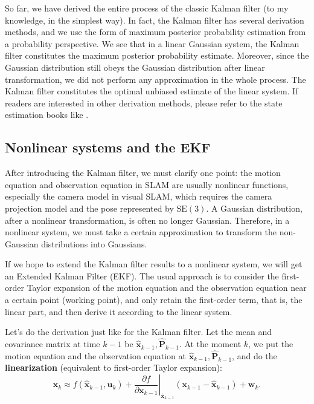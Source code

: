 So far, we have derived the entire process of the classic Kalman filter (to my knowledge, in the simplest way). In fact, the Kalman filter has several derivation methods, and we use the form of maximum posterior probability estimation from a probability perspective. We see that in a linear Gaussian system, the Kalman filter constitutes the maximum posterior probability estimate. Moreover, since the Gaussian distribution still obeys the Gaussian distribution after linear transformation, we did not perform any approximation in the whole process. The Kalman filter constitutes the optimal unbiased estimate of the linear system. If readers are interested in other derivation methods, please refer to the state estimation books like \cite{Barfoot2016}. 

\subsection{Nonlinear systems and the EKF}
After introducing the Kalman filter, we must clarify one point: the motion equation and observation equation in SLAM are usually nonlinear functions, especially the camera model in visual SLAM, which requires the camera projection model and the pose represented by $\mathrm{SE}(3)$.  A Gaussian distribution, after a nonlinear transformation, is often no longer Gaussian. Therefore, in a nonlinear system, we must take a certain approximation to transform the non-Gaussian distributions into Gaussians. 

If we hope to extend the Kalman filter results to a nonlinear system, we will get an Extended Kalman Filter (EKF). The usual approach is to consider the first-order Taylor expansion of the motion equation and the observation equation near a certain point (working point), and only retain the first-order term, that is, the linear part, and then derive it according to the linear system. 

Let's do the derivation just like for the Kalman filter. Let the mean and covariance matrix at time $k-1$ be $\mathbf{\hat{x}}_{k-1},\mathbf{\hat{P}}_{k-1}$. At the moment $k$, we put the motion equation and the observation equation at $\mathbf{\hat{x}}_{k-1},\mathbf{\hat{P}}_{k-1}$, and do the \textbf{linearization} (equivalent to first-order Taylor expansion):
\begin{equation}
	{\mathbf{x}_k} \approx f\left( {{{\mathbf{\hat x}}_{k - 1}},{\mathbf{u}_k}} \right) + {\left. {\frac{{\partial f}}{{\partial {\mathbf{x}_{k - 1}}}}} \right|_{{{\mathbf{\hat x}}_{k - 1}}}}\left( {{\mathbf{x}_{k - 1}} - {{\mathbf{\hat x}}_{k - 1}}} \right) + {\mathbf{w}_k}.
\end{equation}

